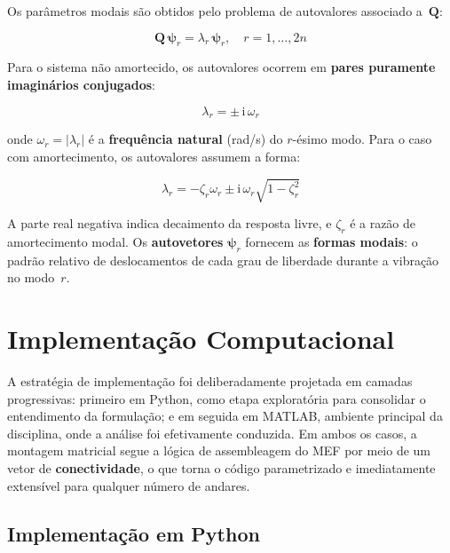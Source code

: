 \documentclass[12pt, a4paper, oneside]{article}
\numberwithin{equation}{section}
\numberwithin{figure}{section}
\numberwithin{table}{section}
\newcommand{\mat}[1]{\mathbf{#1}}
\begin{document}
Os parâmetros modais são obtidos pelo problema de autovalores associado
a~$\mat{Q}$:

\begin{equation}\label{eq:eig}
  \mat{Q}\,\bm{\psi}_r = \lambda_r\,\bm{\psi}_r, \quad r=1,\ldots,2n
\end{equation}

Para o sistema não amortecido, os autovalores ocorrem em
\textbf{pares puramente imaginários conjugados}:

\begin{equation}\label{eq:lambda_undamped}
  \lambda_r = \pm\,\mathrm{i}\,\omega_r
\end{equation}

onde $\omega_r = |\lambda_r|$ é a \textbf{frequência natural} (rad/s) do
$r$-ésimo modo. Para o caso com amortecimento, os autovalores assumem a forma:

\begin{equation}\label{eq:lambda_damped}
  \lambda_r = -\zeta_r\omega_r
              \pm\mathrm{i}\,\omega_r\sqrt{1-\zeta_r^2}
\end{equation}

A parte real negativa indica decaimento da resposta livre, e $\zeta_r$ é a
razão de amortecimento modal. Os \textbf{autovetores} $\bm{\psi}_r$ fornecem
as \textbf{formas modais}: o padrão relativo de deslocamentos de cada grau de
liberdade durante a vibração no modo~$r$.

\section{Implementação Computacional}

A estratégia de implementação foi deliberadamente projetada em camadas
progressivas: primeiro em Python, como etapa exploratória para consolidar o entendimento da formulação; e em seguida em MATLAB, ambiente principal da disciplina, onde a análise foi efetivamente conduzida. Em ambos os
casos, a montagem matricial segue a lógica de assembleagem do MEF por meio de
um vetor de \textbf{conectividade}, o que torna o código parametrizado e
imediatamente extensível para qualquer número de andares.

\subsection{Implementação em Python}
\end{document}
